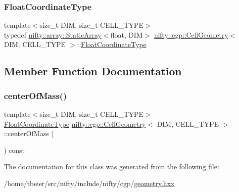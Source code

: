 \subsubsection{\texorpdfstring{Float\+Coordinate\+Type}{FloatCoordinateType}}
{\footnotesize\ttfamily template$<$size\+\_\+t D\+IM, size\+\_\+t C\+E\+L\+L\+\_\+\+T\+Y\+PE$>$ \\
typedef \hyperlink{namespacenifty_1_1array_a683f151f19c851754e0c6d55ed16a0c2}{nifty\+::array\+::\+Static\+Array}$<$float, D\+IM$>$ \hyperlink{classnifty_1_1cgp_1_1CellGeometry}{nifty\+::cgp\+::\+Cell\+Geometry}$<$ D\+IM, C\+E\+L\+L\+\_\+\+T\+Y\+PE $>$\+::\hyperlink{classnifty_1_1cgp_1_1CellGeometry_a07e98f74f6dc5cda1aab1349c7f60d5b}{Float\+Coordinate\+Type}}



\subsection{Member Function Documentation}
\mbox{\label{classnifty_1_1cgp_1_1CellGeometry_a5372d779eeab46c0480e13c9e4ee8a1f}} 
\subsubsection{\texorpdfstring{center\+Of\+Mass()}{centerOfMass()}}
{\footnotesize\ttfamily template$<$size\+\_\+t D\+IM, size\+\_\+t C\+E\+L\+L\+\_\+\+T\+Y\+PE$>$ \\
\hyperlink{classnifty_1_1cgp_1_1CellGeometry_a07e98f74f6dc5cda1aab1349c7f60d5b}{Float\+Coordinate\+Type} \hyperlink{classnifty_1_1cgp_1_1CellGeometry}{nifty\+::cgp\+::\+Cell\+Geometry}$<$ D\+IM, C\+E\+L\+L\+\_\+\+T\+Y\+PE $>$\+::center\+Of\+Mass (\begin{DoxyParamCaption}{ }\end{DoxyParamCaption}) const\hspace{0.3cm}{\ttfamily [inline]}}



The documentation for this class was generated from the following file\+:\begin{DoxyCompactItemize}
\item 
/home/tbeier/src/nifty/include/nifty/cgp/\hyperlink{geometry_8hxx}{geometry.\+hxx}\end{DoxyCompactItemize}
